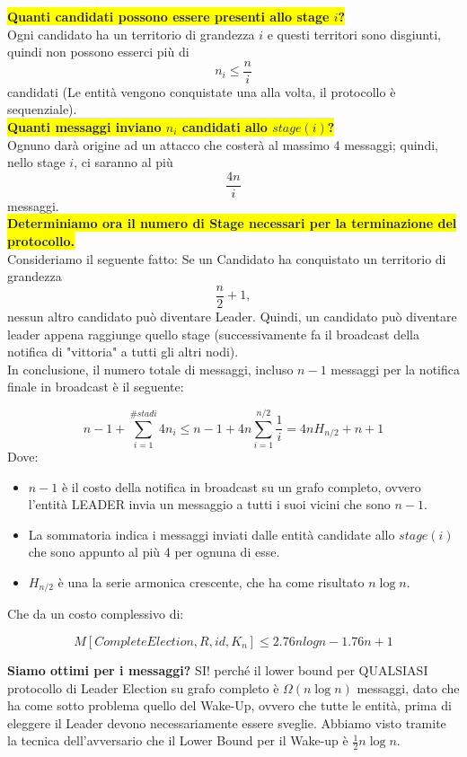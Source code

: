 \colorbox{yellow}{\textbf{Quanti candidati possono essere presenti allo stage
        $i$?}}\\
Ogni candidato ha un territorio di grandezza $i$ e questi territori sono
disgiunti, quindi non possono esserci più di $$n_i \leq \frac{n}{i}$$ candidati
(Le entità vengono conquistate una alla volta, il protocollo è sequenziale). \\

\colorbox{yellow}{\textbf{Quanti messaggi inviano $n_i$ candidati allo
        $stage(i)$?}}\\
Ognuno darà origine ad un attacco che costerà al massimo 4 messaggi; quindi,
nello stage $i$, ci saranno al più $$\frac{4n}{i}$$ messaggi.\\

\colorbox{yellow}{\textbf{Determiniamo ora il numero di Stage necessari per la
        terminazione del protocollo.}} \\
Consideriamo il seguente fatto: Se un Candidato ha conquistato un territorio di
grandezza $$\frac{n}{2} +1,$$ nessun altro candidato può diventare Leader.
Quindi, un candidato può diventare leader appena raggiunge quello stage
(successivamente fa il broadcast della notifica di "vittoria" a tutti gli altri
nodi).\\

In conclusione, il numero totale di messaggi, incluso $n-1$ messaggi per la
notifica finale in broadcast è il seguente:

$$ n-1 + \sum_{i=1}^{\#stadi} 4 n_i \leq n-1 + 4n \sum_{i=1}^{n/2} \frac{1}{i} = 4 n
    H_{n/2} + n + 1$$ Dove:
\begin{itemize}
    \item $n-1$ è il costo della notifica in broadcast su un grafo completo,
          ovvero l'entità LEADER invia un messaggio a tutti i suoi vicini che sono
          $n-1$.
    \item La sommatoria indica i messaggi inviati dalle entità candidate allo
          $stage(i)$ che sono appunto al più 4 per ognuna di esse.
    \item $H_{n/2}$ è una la serie armonica
          crescente, che ha come risultato $n\log n$.

\end{itemize}

Che da un costo complessivo di:

$$M[CompleteElection, R, id, K_n] \leq 2.76 n log n - 1.76 n + 1$$

\textbf{Siamo ottimi per i messaggi?}
SI! perché il lower bound per QUALSIASI protocollo di Leader Election su grafo
completo è $\Omega(n \log n)$ messaggi, dato che ha come sotto problema quello
del Wake-Up, ovvero che tutte le entità, prima di eleggere il Leader devono
necessariamente essere sveglie. Abbiamo visto tramite la tecnica dell'avversario
che il Lower Bound per il Wake-up è $\frac{1}{2}n \log n$.\\



